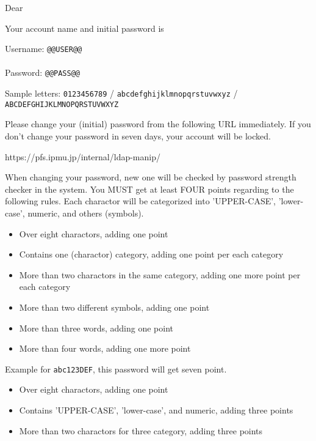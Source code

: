 \documentclass[12pt]{article}
\begin{document}
Dear 

Your account name and initial password is

\begin{center}
Username: {\Huge{\tt \verb|@@USER@@|}} \\
\ \\
Password: {\Huge{\tt \verb|@@PASS@@|}}
\end{center}

Sample letters: 
{\tt 0123456789} / 
{\tt abcdefghijklmnopqrstuvwxyz} / 
{\tt ABCDEFGHIJKLMNOPQRSTUVWXYZ}

 

Please change your (initial) password from the following URL immediately.
If you don't change your password in seven days, 
your account will be locked.

https://pfs.ipmu.jp/internal/ldap-manip/

 

When changing your password, new one will be checked by password strength 
checker in the system.
You MUST get at least FOUR points regarding to the following rules.
Each charactor will be categorized into 'UPPER-CASE', 'lower-case', numeric, and 
others (symbols).

\begin{itemize}
  \item Over eight charactors, adding one point
  \item Contains one (charactor) category, adding one point per each category
  \item More than two charactors in the same category, adding one more point per each category
  \item More than two different symbols, adding one point
  \item More than three words, adding one point
  \item More than four words, adding one more point
\end{itemize}

Example for {\tt abc123DEF}, this password will get seven point.

\begin{itemize}
  \item Over eight charactors, adding one point
  \item Contains 'UPPER-CASE', 'lower-case', and numeric, adding three points
  \item More than two charactors for three category, adding three points
\end{itemize}
\end{document}
